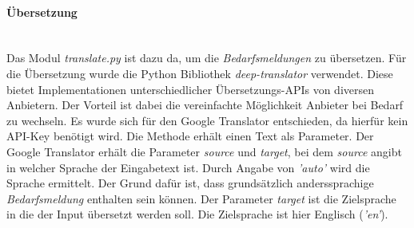 \paragraph{Übersetzung}\mbox{}\\
Das Modul \emph{translate.py} ist dazu da, um die \emph{Bedarfsmeldungen} zu übersetzen. Für die Übersetzung wurde die Python Bibliothek \emph{deep-translator} verwendet. Diese bietet Implementationen unterschiedlicher Übersetzungs-APIs von diversen Anbietern. Der Vorteil ist dabei die vereinfachte Möglichkeit Anbieter bei Bedarf zu wechseln.
%	
Es wurde sich für den Google Translator entschieden, da hierfür kein API-Key benötigt wird. Die Methode erhält einen Text als Parameter. Der Google Translator erhält die Parameter \emph{source} und \emph{target}, bei dem \emph{source} angibt in welcher Sprache der Eingabetext ist. Durch Angabe von \emph{'auto'} wird die Sprache ermittelt. Der Grund dafür ist, dass grundsätzlich anderssprachige \emph{Bedarfsmeldung} enthalten sein können. Der Parameter \emph{target} ist die Zielsprache in die der Input übersetzt werden soll. Die Zielsprache ist hier Englisch (\emph{'en'}).
